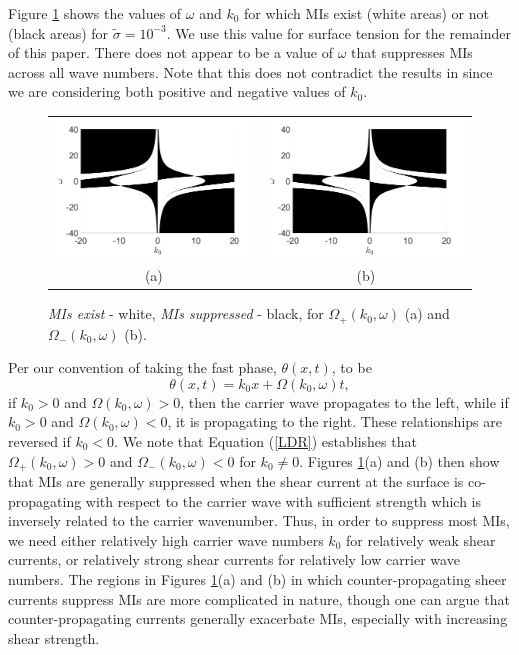 \documentclass{JFM_Style/jfm}
\begin{document}
Figure \ref{fig:miplot} shows the values of $\omega$ and $k_{0}$ for which MIs exist (white areas) or not (black areas) for $\tilde{\sigma}=10^{-3}$.   We use this value for surface tension for the remainder of this paper.  There does not appear to be a value of $\omega$ that suppresses MIs across all wave numbers.  Note that this does not contradict the results in \cite{thomas2012nonlinear} since we are considering both positive and negative values of $k_{0}$.
\begin{figure}
\centering
\begin{tabular}{cc}
\includegraphics[width=.48\textwidth]{foc_defoc_pos_cut} & \includegraphics[width=.48\textwidth]{foc_defoc_neg_cut}\\
(a) & (b)\\
\end{tabular}
\caption{\small {\it MIs exist} - white, {\it MIs suppressed} - black, for $\Omega_{+}(k_{0},\omega)$ (a) and $\Omega_{-}(k_{0},\omega)$ (b).}
\label{fig:miplot}
\end{figure}

Per our convention of taking the fast phase, $\theta(x,t)$, to be
\[
\theta(x,t) = k_{0}x + \Omega(k_{0},\omega) t,
\]
if $k_{0}>0$ and $\Omega(k_{0},\omega)>0$, then the carrier wave propagates to the left, while if $k_0>0$ and $\Omega(k_{0},\omega)<0$, it is propagating to the right.  These relationships are reversed if $k_{0}<0$.  We note that Equation (\ref{LDR}) establishes that $\Omega_{+}(k_{0},\omega) > 0$ and $\Omega_{-}(k_{0},\omega) < 0$ for $k_{0}\neq0$.  Figures \ref{fig:miplot}(a) and (b) then show that MIs are generally suppressed when the shear current at the surface is co-propagating with respect to the carrier wave with sufficient strength which is inversely related to the carrier wavenumber.  Thus, in order to suppress most MIs, we need either relatively high carrier wave numbers $k_{0}$ for relatively weak shear currents, or relatively strong shear currents for relatively low carrier wave numbers.  The regions in Figures \ref{fig:miplot}(a) and (b) in which counter-propagating sheer currents suppress MIs are more complicated in nature, though one can argue that counter-propagating currents generally exacerbate MIs, especially with increasing shear strength.  
\end{document}
